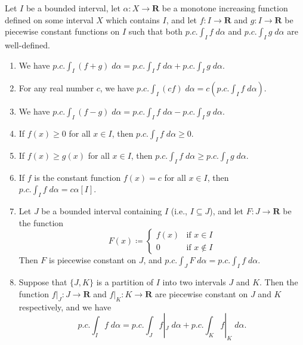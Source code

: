 \begin{theorem}\label{11.8.10}
    Let \(I\) be a bounded interval, let \(\alpha : X \to \mathbf{R}\) be a monotone increasing function defined on some interval \(X\) which contains \(I\), and let \(f : I \to \mathbf{R}\) and \(g : I \to \mathbf{R}\) be piecewise constant functions on \(I\) such that both \(p.c. \int_I f \; d \alpha\) and \(p.c. \int_I g \; d \alpha\) are well-defined.
    \begin{enumerate}
        \item We have \(p.c. \int_I (f + g) \; d \alpha = p.c. \int_I f \; d \alpha + p.c. \int_I g \; d \alpha\).
        \item For any real number \(c\), we have \(p.c. \int_I (cf) \; d \alpha = c (p.c. \int_I f \; d \alpha)\).
        \item We have \(p.c. \int_I (f - g) \; d \alpha = p.c. \int_I f \; d \alpha - p.c. \int_I g \; d \alpha\).
        \item If \(f(x) \geq 0\) for all \(x \in I\), then \(p.c. \int_I f \; d \alpha \geq 0\).
        \item If \(f(x) \geq g(x)\) for all \(x \in I\), then \(p.c. \int_I f \; d \alpha \geq p.c. \int_I g \; d \alpha\).
        \item If \(f\) is the constant function \(f(x) = c\) for all \(x \in I\), then \(p.c. \int_I f \; d \alpha = c \alpha[I]\).
        \item Let \(J\) be a bounded interval containing \(I\) (i.e., \(I \subseteq J\)), and let \(F : J \to \mathbf{R}\) be the function
              \[
                  F(x) \coloneqq \begin{cases}
                      f(x) & \text{if } x \in I    \\
                      0    & \text{if } x \notin I
                  \end{cases}
              \]
              Then \(F\) is piecewise constant on \(J\), and \(p.c. \int_J F \; d \alpha = p.c. \int_I f \; d \alpha\).
        \item Suppose that \(\{J, K\}\) is a partition of \(I\) into two intervals \(J\) and \(K\).
              Then the function \(f|_J : J \to \mathbf{R}\) and \(f|_K : K \to \mathbf{R}\) are piecewise constant on \(J\) and \(K\) respectively, and we have
              \[
                  p.c. \int_I f \; d \alpha = p.c. \int_J f|_J \; d \alpha + p.c. \int_K f|_K \; d \alpha.
              \]
    \end{enumerate}
\end{theorem}


